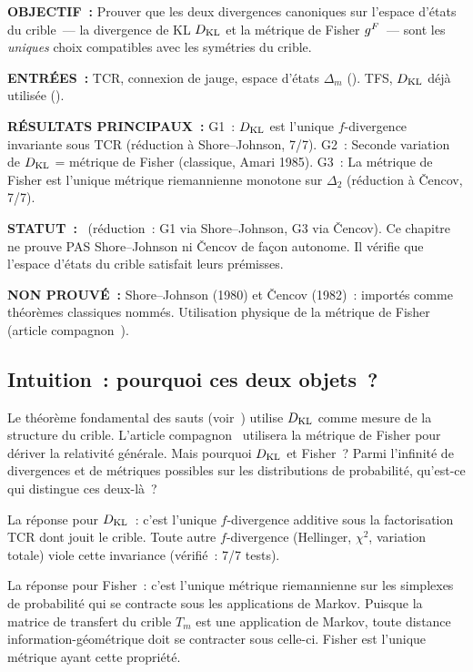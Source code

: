 \documentclass[12pt,a4paper]{article}
\begin{document}
\begin{statusbox}
\textbf{OBJECTIF~:}
  Prouver que les deux divergences canoniques sur l'espace d'états du
  crible~--- la divergence de KL $D_{\mathrm{KL}}$ et la métrique de Fisher
  $g^F$~--- sont les \emph{uniques} choix compatibles avec les
  symétries du crible.

\textbf{ENTRÉES~:}
  TCR, connexion de jauge, espace d'états $\Delta_m$
  (\cite{companion_M1}).
  TFS, $D_{\mathrm{KL}}$ déjà utilisée (\cite{companion_M1}).

\textbf{RÉSULTATS PRINCIPAUX~:}
  G1~: $D_{\mathrm{KL}}$ est l'unique $f$-divergence invariante sous TCR
  (réduction à Shore--Johnson, 7/7).
  G2~: Seconde variation de $D_{\mathrm{KL}}$ = métrique de Fisher (classique,
  Amari 1985).
  G3~: La métrique de Fisher est l'unique métrique riemannienne
  monotone sur $\Delta_2$ (réduction à \v Cencov, 7/7).

\textbf{STATUT~:}
  \THMTAG~(réduction~: G1 via Shore--Johnson, G3 via \v Cencov).
  Ce chapitre ne prouve PAS Shore--Johnson ni \v Cencov de façon
  autonome. Il vérifie que l'espace d'états du crible satisfait
  leurs prémisses.

\textbf{NON PROUVÉ~:}
  Shore--Johnson (1980) et \v Cencov (1982)~: importés comme théorèmes
  classiques nommés. Utilisation physique de la métrique de Fisher
  (article compagnon~\cite{companion_physics}).
\end{statusbox}

\subsection{Intuition~: pourquoi ces deux objets~?}
\label{sec:ch5_intuition}

Le théorème fondamental des sauts (voir~\cite{companion_M1}) utilise
$D_{\mathrm{KL}}$ comme mesure de la structure du crible. L'article
compagnon~\cite{companion_physics} utilisera la métrique de Fisher
pour dériver la relativité générale. Mais pourquoi $D_{\mathrm{KL}}$ et Fisher~?
Parmi l'infinité de divergences et de métriques possibles sur les
distributions de probabilité, qu'est-ce qui distingue ces deux-là~?

La réponse pour $D_{\mathrm{KL}}$~: c'est l'unique $f$-divergence additive sous la
factorisation TCR dont jouit le crible. Toute autre $f$-divergence
(Hellinger, $\chi^2$, variation totale) viole cette invariance
(vérifié~: 7/7 tests).

La réponse pour Fisher~: c'est l'unique métrique riemannienne sur les
simplexes de probabilité qui se contracte sous les applications de
Markov. Puisque la matrice de transfert du crible $T_m$ est une
application de Markov, toute distance information-géométrique doit se
contracter sous celle-ci. Fisher est l'unique métrique ayant cette
propriété.
\end{document}
